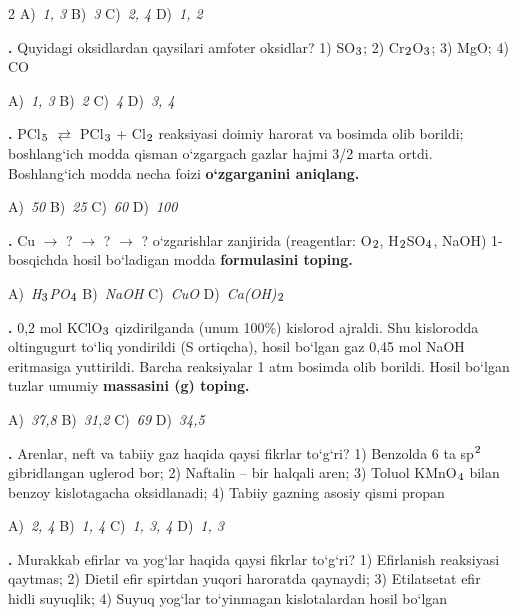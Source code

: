 \documentclass[11pt,a4paper]{article}
\renewcommand{\textsubscript}[1]{\ensuremath{_{\text{\fontsize{8}{8}\selectfont #1}}}}
\renewcommand{\textsuperscript}[1]{\ensuremath{^{\text{\fontsize{8}{8}\selectfont #1}}}}
\newcommand{\qn}[1]{\textbf{\fontsize{11.5}{13}\selectfont #1}}
\newcommand{\qsep}{\par\vspace{13pt}}
\begin{document}
\begin{multicols}{2}
\noindent A)~\textsl{1, 3} \hfill B)~\textsl{3} \hfill C)~\textsl{2, 4} \hfill D)~\textsl{1, 2}\par
\qsep
\noindent\qn{16.} Quyidagi oksidlardan qaysilari amfoter oksidlar? 1) SO\textsubscript{3}; 2) Cr\textsubscript{2}O\textsubscript{3}; 3) MgO; 4) CO

\noindent A)~\textsl{1, 3} \hfill B)~\textsl{2} \hfill C)~\textsl{4} \hfill D)~\textsl{3, 4}\par
\qsep
\noindent\qn{17.} PCl\textsubscript{5} $\rightleftarrows$ PCl\textsubscript{3} + Cl\textsubscript{2} reaksiyasi doimiy harorat va bosimda olib borildi; boshlang`ich modda qisman o`zgargach gazlar hajmi 3/2 marta ortdi. Boshlang`ich modda necha foizi \textbf{o`zgarganini aniqlang.}

\noindent A)~\textsl{50} \hfill B)~\textsl{25} \hfill C)~\textsl{60} \hfill D)~\textsl{100}\par
\qsep
\noindent\qn{18.} Cu $\to$ ? $\to$ ? $\to$ ? o`zgarishlar zanjirida (reagentlar: O\textsubscript{2}, H\textsubscript{2}SO\textsubscript{4}, NaOH) 1-bosqichda hosil bo`ladigan modda \textbf{formulasini toping.}

\noindent A)~\textsl{H\textsubscript{3}PO\textsubscript{4}} \hfill B)~\textsl{NaOH} \hfill C)~\textsl{CuO} \hfill D)~\textsl{Ca(OH)\textsubscript{2}}\par
\qsep
\noindent\qn{19.} 0,2 mol KClO\textsubscript{3} qizdirilganda (unum 100\%) kislorod ajraldi. Shu kislorodda oltingugurt to`liq yondirildi (S ortiqcha), hosil bo`lgan gaz 0,45 mol NaOH eritmasiga yuttirildi. Barcha reaksiyalar 1 atm bosimda olib borildi. Hosil bo`lgan tuzlar umumiy \textbf{massasini (g) toping.}

\noindent A)~\textsl{37,8} \hfill B)~\textsl{31,2} \hfill C)~\textsl{69} \hfill D)~\textsl{34,5}\par
\qsep
\noindent\qn{20.} Arenlar, neft va tabiiy gaz haqida qaysi fikrlar to`g`ri? 1) Benzolda 6 ta sp\textsuperscript{2} gibridlangan uglerod bor; 2) Naftalin -- bir halqali aren; 3) Toluol KMnO\textsubscript{4} bilan benzoy kislotagacha oksidlanadi; 4) Tabiiy gazning asosiy qismi propan

\noindent A)~\textsl{2, 4} \hfill B)~\textsl{1, 4} \hfill C)~\textsl{1, 3, 4} \hfill D)~\textsl{1, 3}\par
\qsep
\noindent\qn{21.} Murakkab efirlar va yog`lar haqida qaysi fikrlar to`g`ri? 1) Efirlanish reaksiyasi qaytmas; 2) Dietil efir spirtdan yuqori haroratda qaynaydi; 3) Etilatsetat efir hidli suyuqlik; 4) Suyuq yog`lar to`yinmagan kislotalardan hosil bo`lgan


\end{multicols}
\end{document}
